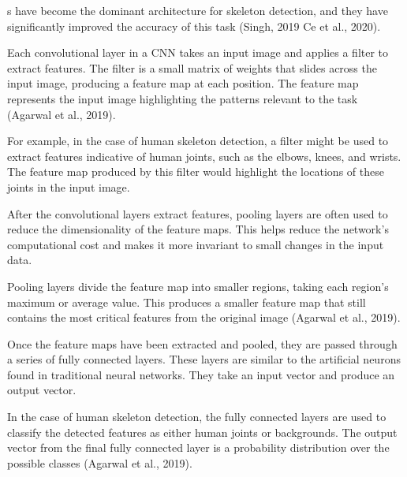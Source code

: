 \CNN\-s have become the dominant architecture for skeleton detection, and they have significantly improved the accuracy of this task (\scc Singh, 2019\; \scc Ce et al., 2020).


Each convolutional layer in a CNN takes an input image and applies a filter to extract features. The filter is a small matrix of weights that slides across the input image, producing a feature map at each position. The feature map represents the input image highlighting the patterns relevant to the task (\scc Agarwal et al., 2019).

For example, in the case of human skeleton detection, a filter might be used to extract features indicative of human joints, such as the elbows, knees, and wrists. The feature map produced by this filter would highlight the locations of these joints in the input image.


After the convolutional layers extract features, pooling layers are often used to reduce the dimensionality of the feature maps. This helps reduce the network's computational cost and makes it more invariant to small changes in the input data.

Pooling layers divide the feature map into smaller regions, taking each region's maximum or average value. This produces a smaller feature map that still contains the most critical features from the original image (\scc Agarwal et al., 2019).


Once the feature maps have been extracted and pooled, they are passed through a series of fully connected layers. These layers are similar to the artificial neurons found in traditional neural networks. They take an input vector and produce an output vector.

In the case of human skeleton detection, the fully connected layers are used to classify the detected features as either human joints or backgrounds. The output vector from the final fully connected layer is a probability distribution over the possible classes (\scc Agarwal et al., 2019).


